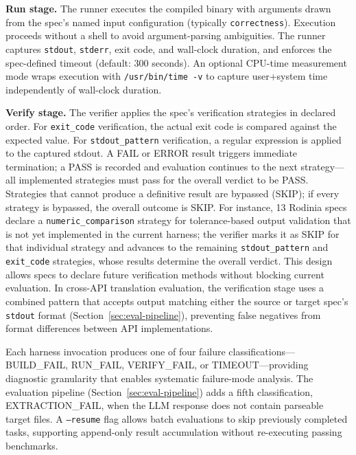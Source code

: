 \documentclass[conference]{IEEEtran}
\begin{document}
\textbf{Run stage.} The runner executes the compiled binary with arguments drawn from the spec's named input configuration (typically \texttt{correctness}). Execution proceeds without a shell to avoid argument-parsing ambiguities. The runner captures \texttt{stdout}, \texttt{stderr}, exit code, and wall-clock duration, and enforces the spec-defined timeout (default: 300 seconds). An optional CPU-time measurement mode wraps execution with \texttt{/usr/bin/time -v} to capture user+system time independently of wall-clock duration.

\textbf{Verify stage.} The verifier applies the spec's verification strategies in declared order. For \texttt{exit\_code} verification, the actual exit code is compared against the expected value. For \texttt{stdout\_pattern} verification, a regular expression is applied to the captured stdout. A FAIL or ERROR result triggers immediate termination; a PASS is recorded and evaluation continues to the next strategy---all implemented strategies must pass for the overall verdict to be PASS. Strategies that cannot produce a definitive result are bypassed (SKIP); if every strategy is bypassed, the overall outcome is SKIP. For instance, 13 Rodinia specs declare a \texttt{numeric\_comparison} strategy for tolerance-based output validation that is not yet implemented in the current harness; the verifier marks it as SKIP for that individual strategy and advances to the remaining \texttt{stdout\_pattern} and \texttt{exit\_code} strategies, whose results determine the overall verdict. This design allows specs to declare future verification methods without blocking current evaluation. In cross-API translation evaluation, the verification stage uses a combined pattern that accepts output matching either the source or target spec's \texttt{stdout} format (Section~\ref{sec:eval-pipeline}), preventing false negatives from format differences between API implementations.

Each harness invocation produces one of four failure classifications---BUILD\_FAIL, RUN\_FAIL, VERIFY\_FAIL, or TIMEOUT---providing diagnostic granularity that enables systematic failure-mode analysis. The evaluation pipeline (Section~\ref{sec:eval-pipeline}) adds a fifth classification, EXTRACTION\_FAIL, when the LLM response does not contain parseable target files. A \texttt{--resume} flag allows batch evaluations to skip previously completed tasks, supporting append-only result accumulation without re-executing passing benchmarks.
\end{document}
